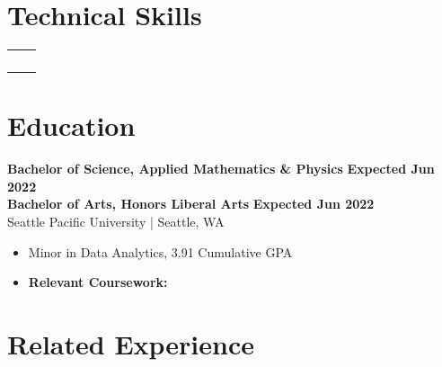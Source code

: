 \documentclass{article}
\begin{document}
\maketitle




\section{Technical Skills}
    \begin{flushleft}
        \begin{tabular}{>{\raggedleft\arraybackslash}p{1.25in} >{\raggedright\arraybackslash}p{5.85in}}
             \\
             \\
             \\
             \\
             \\
        \end{tabular}
    \end{flushleft}




\section{Education}

    \textbf{Bachelor of Science, Applied Mathematics \& Physics} \hfill \textbf{Expected Jun 2022}\\
    \textbf{Bachelor of Arts, Honors Liberal Arts} \hfill \textbf{Expected Jun 2022}\\
    Seattle Pacific University | Seattle, WA 
    \squish
    \begin{itemize} %
        \item Minor in Data Analytics, 3.91 Cumulative GPA
        \item 
        \textbf{Relevant Coursework:} 
    \end{itemize}


\section{Related Experience}
\end{document}
